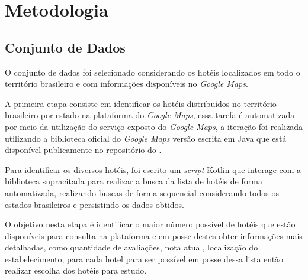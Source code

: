 \chapter{Metodologia}
\label{cap:metodologia}


\section{Conjunto de Dados}
\label{cap:metodologia:sec:conjunto_dados}


O conjunto de dados foi selecionado considerando os hotéis localizados em todo o território brasileiro e com informações disponíveis no \textit{Google Maps}.

A primeira etapa consiste em identificar os hotéis distribuídos no território brasileiro por estado na plataforma do \textit{Google Maps}, essa tarefa é automatizada por meio da utilização do serviço exposto do \textit{Google Maps}, a iteração foi realizada utilizando a biblioteca oficial do \textit{Google Maps} versão escrita em Java que está disponível publicamente no repositório do .

Para identificar os diversos hotéis, foi escrito um \emph{script} Kotlin \cite{scriptKotlinBuscarHoteis} que interage com a biblioteca supracitada para realizar a busca da lista de hotéis de forma automatizada, realizando buscas de forma sequencial considerando todos os estados brasileiros e persistindo os dados obtidos.

O objetivo nesta etapa é identificar o maior número possível de hotéis que estão disponíveis para consulta na plataforma e em posse destes obter informações mais detalhadas, como quantidade de avaliações, nota atual, localização do estabelecimento, para cada hotel para ser possível em posse dessa lista então realizar escolha dos hotéis para estudo.

